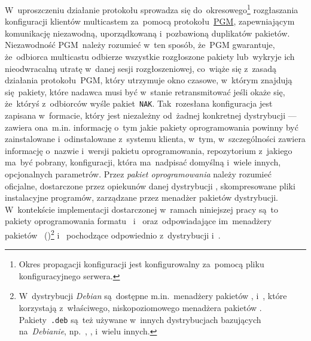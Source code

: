 \documentclass[thesis]{subfiles}
\begin{document}
W~uproszczeniu działanie protokołu sprowadza się do~okresowego\footnote{Okres propagacji konfiguracji jest konfigurowalny za~pomocą pliku konfiguracyjnego serwera.} rozgłaszania konfiguracji klientów multicastem za~pomocą protokołu~\hyperref[sec:pgm]{PGM}, zapewniającym komunikację niezawodną, uporządkowaną i~pozbawioną duplikatów pakietów. Niezawodność PGM~należy rozumieć w~ten sposób, że~PGM gwarantuje, że~odbiorca multicastu odbierze wszystkie rozgłoszone pakiety lub~wykryje ich nieodwracalną utratę w~danej sesji rozgłoszeniowej, co~wiąże się z~zasadą działania protokołu~PGM, który utrzymuje okno czasowe, w~którym znajdują się~pakiety, które nadawca musi być w~stanie retransmitować jeśli okaże się, że~któryś z~odbiorców wyśle pakiet~\texttt{NAK}. Tak~rozesłana konfiguracja jest zapisana w~formacie, który jest niezależny od~żadnej konkretnej dystrybucji  --- zawiera ona~m.in. informację o~tym jakie pakiety oprogramowania powinny być zainstalowane i~odinstalowane z~systemu klienta, w~tym, w~szczególności zawiera informację o~nazwie i~wersji pakietu oprogramowania, repozytorium z~jakiego ma~być pobrany, konfiguracji, która ma~nadpisać domyślną i~wiele innych, opcjonalnych parametrów. Przez \emph{pakiet oprogramowania} należy rozumieć oficjalne, dostarczone przez opiekunów danej dystrybucji , skompresowane pliki instalacyjne programów, zarządzane przez menadżer pakietów dystrybucji. W~kontekście implementacji dostarczonej w~ramach niniejszej pracy są~to pakiety oprogramowania formatu~ i~ oraz~odpowiadające im~menadżery pakietów ~()\footnote{W~dystrybucji \emph{Debian} są~dostępne m.in.~menadżery pakietów ,  i~, które korzystają z~właściwego, niskopoziomowego menadżera pakietów . Pakiety~\texttt{.deb} są~też używane w~innych dystrybucjach bazujących na~\emph{Debianie}, np.~, ,  i~wielu innych.} i~ pochodzące odpowiednio z~dystrybucji  i~.
\end{document}
